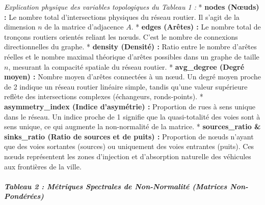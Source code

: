 \documentclass[10pt, a4paper]{article}
\begin{document}
\emph{Explication physique des variables topologiques du Tableau 1 :} *
\textbf{nodes (Nœuds) :} Le nombre total d'intersections physiques du
réseau routier. Il s'agit de la dimension \(n\) de la matrice
d'adjacence \(A\). * \textbf{edges (Arêtes) :} Le nombre total de
tronçons routiers orientés reliant les nœuds. C'est le nombre de
connexions directionnelles du graphe. * \textbf{density (Densité) :}
Ratio entre le nombre d'arêtes réelles et le nombre maximal théorique
d'arêtes possibles dans un graphe de taille \(n\), mesurant la compacité
spatiale du réseau routier. * \textbf{avg\_degree (Degré moyen) :}
Nombre moyen d'arêtes connectées à un nœud. Un degré moyen proche de 2
indique un réseau routier linéaire simple, tandis qu'une valeur
supérieure reflète des intersections complexes (échangeurs,
ronds-points). * \textbf{asymmetry\_index (Indice d'asymétrie) :}
Proportion de rues à sens unique dans le réseau. Un indice proche de 1
signifie que la quasi-totalité des voies sont à sens unique, ce qui
augmente la non-normalité de la matrice. * \textbf{sources\_ratio \&
sinks\_ratio (Ratio de sources et de puits) :} Proportion de nœuds
n'ayant que des voies sortantes (sources) ou uniquement des voies
entrantes (puits). Ces nœuds représentent les zones d'injection et
d'absorption naturelle des véhicules aux frontières de la ville.

\subparagraph{Tableau 2 : Métriques Spectrales de Non-Normalité
(Matrices
Non-Pondérées)}\label{tableau-2-muxe9triques-spectrales-de-non-normalituxe9-matrices-non-ponduxe9ruxe9es}
\end{document}
